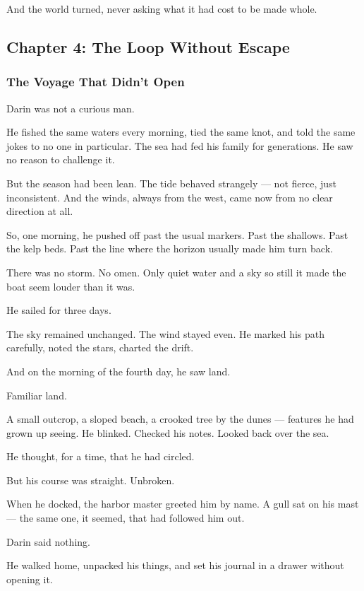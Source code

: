 \documentclass[12pt]{article}
\begin{document}
And the world turned, never asking what it had cost to be made whole.

\newpage

\subsection{Chapter 4: The Loop Without Escape}

\vspace{.5in}

\subsubsection{The Voyage That Didn’t Open}

Darin was not a curious man.

He fished the same waters every morning, tied the same knot, and told the same jokes to no one in particular. The sea had fed his family for generations. He saw no reason to challenge it.

But the season had been lean. The tide behaved strangely — not fierce, just inconsistent. And the winds, always from the west, came now from no clear direction at all.

So, one morning, he pushed off past the usual markers. Past the shallows. Past the kelp beds. Past the line where the horizon usually made him turn back.

There was no storm. No omen. Only quiet water and a sky so still it made the boat seem louder than it was.

He sailed for three days.

The sky remained unchanged. The wind stayed even. He marked his path carefully, noted the stars, charted the drift.

And on the morning of the fourth day, he saw land.

Familiar land.

A small outcrop, a sloped beach, a crooked tree by the dunes — features he had grown up seeing. He blinked. Checked his notes. Looked back over the sea.

He thought, for a time, that he had circled.

But his course was straight. Unbroken.

When he docked, the harbor master greeted him by name. A gull sat on his mast — the same one, it seemed, that had followed him out.

Darin said nothing.

He walked home, unpacked his things, and set his journal in a drawer without opening it.
\end{document}
